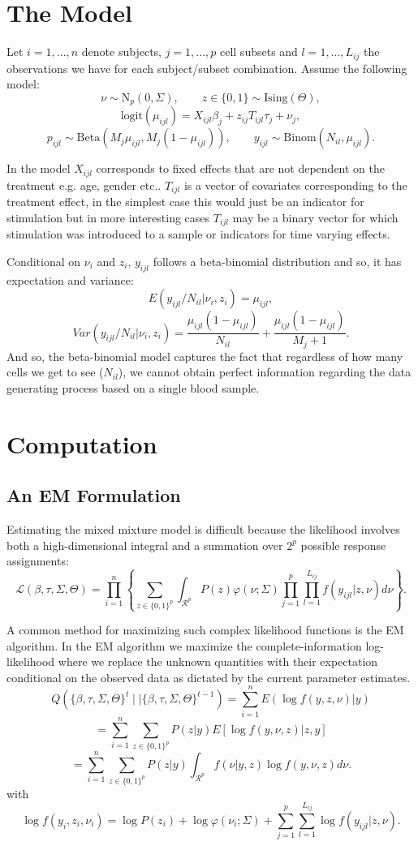 \documentclass{article}
\begin{document}
\section{The Model}
Let $i=1,...,n$ denote subjects, $j=1,...,p$ cell subsets and $l=1,...,L_{ij}$ the observations we have for each subject/subset combination. Assume the following model:
$$
\nu \sim \text{N}_p(0, \Sigma), \qquad z\in\{0, 1\} \sim \text{Ising}(\Theta),
$$$$
\text{logit}(\mu_{ijl}) = X_{ijl}\beta_{j} + z_{ij} T_{ijl} \tau_{j} + \nu_j,
$$$$
p_{ijl} \sim \text{Beta}(M_j\mu_{ijl},M_j(1 - \mu_{ijl})), \qquad
y_{ijl} \sim \text{Binom}(N_{il}, \mu_{ijl}).
$$

In the model $X_{ijl}$ corresponds to fixed effects that are not dependent on the treatment e.g. age, gender etc.. $T_{ijl}$ is a vector of covariates corresponding to the treatment effect, in the simplest case this would just be an indicator for stimulation but in more interesting cases $T_{ijl}$ may be a binary vector for which stimulation was introduced to a sample or indicators for time varying effects. 

Conditional on $\nu_i$ and $z_i$, $y_{ijl}$ follows a beta-binomial distribution and so, it has expectation and variance:
$$ 
E(y_{ijl} / N_{il} | \nu_i, z_i) = \mu_{ijl}, 
$$$$
Var(y_{ijl} / N_{il}| \nu_i, z_i) = \frac{\mu_{ijl}(1 - \mu_{ijl})}{N_{il}} + \frac{\mu_{ijl}(1 - \mu_{ijl})}{M_j + 1}.
$$
And so, the beta-binomial model captures the fact that regardless of how many cells we get to see ($N_{il}$), we cannot obtain perfect information regarding the data generating process based on a single blood sample.  



\section{Computation}
\subsection{An EM Formulation}
Estimating the mixed mixture model is difficult because the likelihood involves both a high-dimensional integral and a summation over $2^{p}$ possible response assignments:
$$
\mathcal{L}(\beta,\tau,\Sigma,\Theta) = \prod_{i=1}^{n}\left\{
\sum_{z\in\{0,1\}^{p}}\int_{\mathcal{R}^{p}}P(z)\varphi(\nu ; \Sigma) 
\prod_{j=1}^{p}\prod_{l=1}^{L_{ij}} f(y_{ijl}|z,\nu)d\nu 
\right\}.
$$

A common method for maximizing such complex likelihood functions is the EM algorithm. In the EM algorithm we maximize the complete-information log-likelihood where we replace the unknown quantities with their expectation conditional on the observed data as dictated by the current parameter estimates. 
$$
Q\left(\{\beta,\tau,\Sigma,\Theta\}^{t} \mid| \{\beta,\tau,\Sigma,\Theta\}^{t-1}
\right) =\sum_{i=1}^{n} E(\log f(y, z, \nu) | y)
$$$$
= \sum_{i=1}^{n}\sum_{z\in\{0,1\}^{p}}P(z|y) E\left[\log f(y,\nu, z) | z, y \right]
$$$$
= \sum_{i=1}^{n}\sum_{z\in\{0,1\}^{p}}P(z|y) \int_{\mathcal{R}^{p}} f(\nu | y, z) \log f(y, \nu, z) d\nu.
$$
with
$$
\log f(y_i, z_i, \nu_i) = \log P(z_i) + \log \varphi(\nu_i ; \Sigma) + \sum_{j=1}^{p}\sum_{l=1}^{L_{ij}}
\log f(y_{ijl} | z, \nu).
$$
\end{document}
